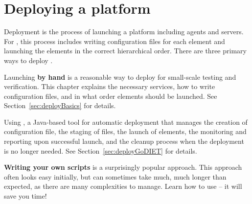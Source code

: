 
\newcommand{\bla}{}
\chapter{Deploying a \diet platform}
\label{ch:deploying}


Deployment is the process of launching a \diet platform including agents and
servers. For \diet, this process includes writing configuration files for each
element and launching the elements in the correct hierarchical order. There are
three primary ways to deploy \diet.

Launching \textbf{by hand} is a reasonable way to deploy \diet for small-scale
testing and verification. This chapter explains the necessary services, how to
write \diet configuration files, and in what order \diet elements should be
launched. See Section~\ref{sec:deployBasics} for details.

Using \textbf{\godiet}, a Java-based tool for automatic \diet deployment that
manages the creation of configuration file, the staging of files, the launch of elements,
the monitoring and reporting upon successful launch, and the cleanup process when the \diet
deployment is no longer needed. See Section~\ref{sec:deployGoDIET} for
details.

\textbf{Writing your own scripts} is a surprisingly popular approach. This
approach often looks easy initially, but can sometimes take much, much longer
than expected, as there are many complexities to manage. Learn how to use \godiet -- it
will save you time!





